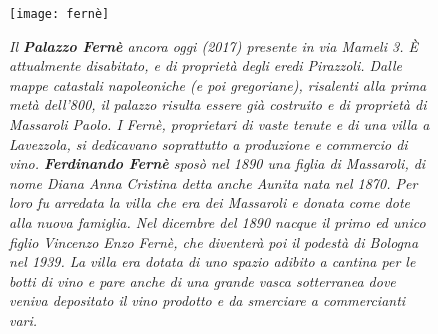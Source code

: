  \begin{figure}[htb]
    \centering
    \texttt{[image: fernè]}
    \caption[Palazzo Fernè]{\textit{Il \textbf{Palazzo Fernè} ancora oggi (2017) presente in via Mameli 3. È attualmente disabitato, e di proprietà degli eredi Pirazzoli. Dalle mappe catastali napoleoniche (e poi gregoriane), risalenti alla prima metà dell'800, il palazzo risulta essere già costruito e di proprietà di Massaroli Paolo. I Fernè, proprietari di vaste tenute e di una villa a Lavezzola, si dedicavano soprattutto a produzione e commercio di vino. \textbf{Ferdinando Fernè} sposò nel 1890 una figlia di Massaroli, di nome Diana Anna Cristina detta anche Aunita nata nel 1870. Per loro fu arredata la villa che era dei Massaroli e donata come dote alla nuova famiglia. Nel dicembre del 1890 nacque il primo ed unico figlio Vincenzo Enzo Fernè, che diventerà poi il podestà di Bologna nel 1939. La villa era dotata di uno spazio adibito a cantina per le botti di vino e pare anche di una grande vasca sotterranea dove veniva depositato il vino prodotto e da smerciare a commercianti vari. }}
    \label{fig:fernè}
\end{figure}










































%